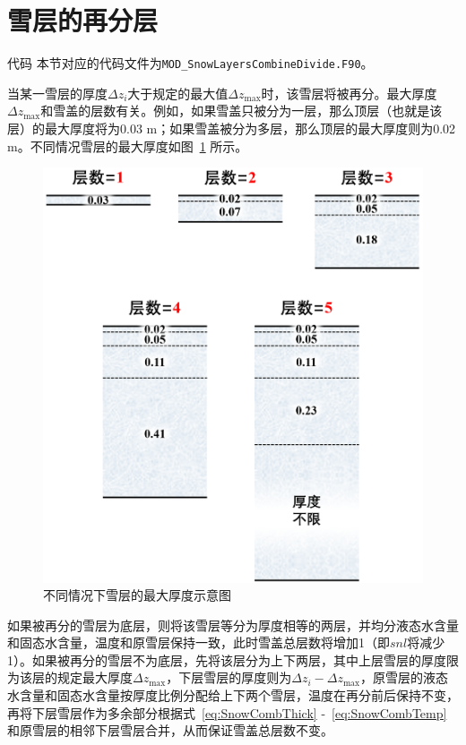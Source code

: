 \section{雪层的再分层}\label{雪层的再分层}
\begin{mymdframed}{代码}
  本节对应的代码文件为\texttt{MOD\_SnowLayersCombineDivide.F90}。
\end{mymdframed}

当某一雪层的厚度$\Delta z_i$大于规定的最大值$\Delta z_{\mathrm{max}}$时，该雪层将被再分。最大厚度$\Delta z_{\mathrm{max}}$和雪盖的层数有关。例如，如果雪盖只被分为一层，那么顶层（也就是该层）的最大厚度将为0.03 \unit{m}；如果雪盖被分为多层，那么顶层的最大厚度则为0.02 \unit{m}。不同情况雪层的最大厚度如图~\ref{fig:不同情况下雪层的最大厚度} 所示。

{
  \begin{figure}[htbp]
    \centering
    \includegraphics[width=0.6\columnwidth]{Figures/雪盖土壤热力过程/不同情况下雪层的最大厚度.png}
    \caption{不同情况下雪层的最大厚度示意图}
    \label{fig:不同情况下雪层的最大厚度}
  \end{figure}
}

如果被再分的雪层为底层，则将该雪层等分为厚度相等的两层，并均分液态水含量和固态水含量，温度和原雪层保持一致，此时雪盖总层数将增加1（即$snl$将减少1）。如果被再分的雪层不为底层，先将该层分为上下两层，其中上层雪层的厚度限为该层的规定最大厚度$\Delta z_{\mathrm{max}}$，下层雪层的厚度则为$\Delta z_i - \Delta z_{\mathrm{max}}$，原雪层的液态水含量和固态水含量按厚度比例分配给上下两个雪层，温度在再分前后保持不变，再将下层雪层作为多余部分根据式~\eqref{eq:SnowCombThick} -~\eqref{eq:SnowCombTemp} 和原雪层的相邻下层雪层合并，从而保证雪盖总层数不变。

